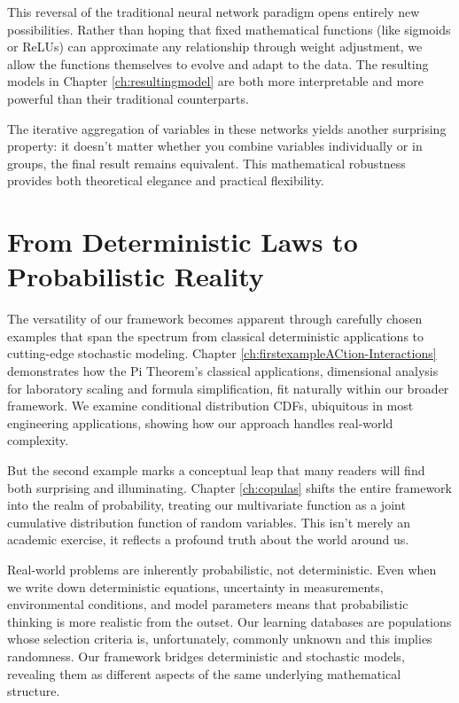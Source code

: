 \documentclass[
	11pt, %
	fleqn, %
	a4paper, %
]{LegrandOrangeBook}
\begin{document}
This reversal of the traditional neural network paradigm opens entirely new possibilities. Rather than hoping that fixed mathematical functions (like sigmoids or ReLUs) can approximate any relationship through weight adjustment, we allow the functions themselves to evolve and adapt to the data. The resulting models in Chapter \ref{ch:resultingmodel} are both more interpretable and more powerful than their traditional counterparts.

The iterative aggregation of variables in these networks yields another surprising property: it doesn't matter whether you combine variables individually or in groups, the final result remains equivalent. This mathematical robustness provides both theoretical elegance and practical flexibility.

\section{From Deterministic Laws to Probabilistic Reality}

The versatility of our framework becomes apparent through carefully chosen examples that span the spectrum from classical deterministic applications to cutting-edge stochastic modeling. Chapter \ref{ch:firstexampleACtion-Interactions} demonstrates how the Pi Theorem's classical applications, dimensional analysis for laboratory scaling and formula simplification, fit naturally within our broader framework. We examine conditional distribution CDFs, ubiquitous in most engineering applications, showing how our approach handles real-world complexity.

But the second example marks a conceptual leap that many readers will find both surprising and illuminating. Chapter \ref{ch:copulas} shifts the entire framework into the realm of probability, treating our multivariate function as a joint cumulative distribution function of random variables. This isn't merely an academic exercise, it reflects a profound truth about the world around us.

Real-world problems are inherently probabilistic, not deterministic. Even when we write down deterministic equations, uncertainty in measurements, environmental conditions, and model parameters means that probabilistic thinking is more realistic from the outset. Our learning databases are populations whose selection criteria is, unfortunately, commonly unknown and this implies randomness.  Our framework bridges deterministic and stochastic models, revealing them as different aspects of the same underlying mathematical structure.
\end{document}
